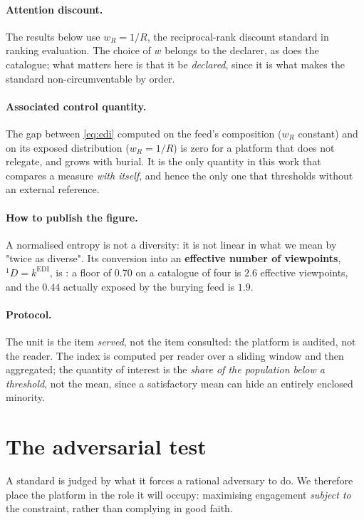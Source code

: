 \documentclass[11pt,a4paper]{article}
\begin{document}
\paragraph{Attention discount.} The results below use $w_R = 1/R$, the reciprocal-rank
discount standard in ranking evaluation. The choice of $w$ belongs to the declarer, as does
the catalogue; what matters here is that it be \emph{declared}, since it is what makes the
standard non-circumventable by order.

\paragraph{Associated control quantity.} The gap between \eqref{eq:edi} computed on the feed's
composition ($w_R$ constant) and on its exposed distribution ($w_R = 1/R$) is zero for a
platform that does not relegate, and grows with burial. It is the only quantity in this work
that compares a measure \emph{with itself}, and hence the only one that thresholds without an
external reference.

\paragraph{How to publish the figure.} A normalised entropy is not a diversity: it is not linear
in what we mean by "twice as diverse". Its conversion into an \textbf{effective number of
viewpoints}, ${}^{1}\!D = k^{\mathrm{EDI}}$, is \citep{jost2006}: a floor of $0.70$ on a catalogue
of four is $2.6$ effective viewpoints, and the $0.44$ actually exposed by the burying feed is
$1.9$.

\paragraph{Protocol.} The unit is the item \emph{served}, not the item consulted: the platform
is audited, not the reader. The index is computed per reader over a sliding window and then
aggregated; the quantity of interest is the \emph{share of the population below a threshold},
not the mean, since a satisfactory mean can hide an entirely enclosed minority.

\section{The adversarial test}
\label{sec:adversarial}

A standard is judged by what it forces a rational adversary to do. We therefore place the
platform in the role it will occupy: maximising engagement \emph{subject to} the constraint,
rather than complying in good faith.
\end{document}
